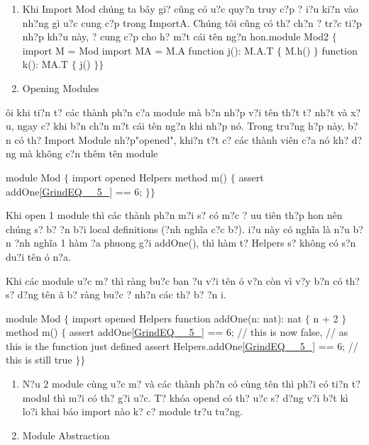 \documentclass{article} %
\begin{document}
\begin{enumerate}
\item  Khi Import Mod ch\'{u}ng ta b\^{a}y gi? c\~{u}ng c\'{o} {\dj}u?c quy?n truy c?p {\dj}? {\dj}i?u ki?n v\`{a}o nh?ng g\`{i} {\dj}u?c cung c?p trong ImportA. Ch\'{u}ng t\^{o}i c\~{u}ng c\'{o} th? ch?n {\dj}? tr?c ti?p nh?p kh?u n\`{a}y, {\dj}? cung c?p cho h? m?t c\'{a}i t\^{e}n ng?n hon.module Mod2 $\{$  import M = Mod  import MA = M.A  function j(): M.A.T $\{$ M.h() $\}$  function k(): MA.T $\{$ j() $\}$$\}$

\item  Opening Modules
\end{enumerate}

{\DJ}\^{o}i khi ti?n t? c\'{a}c th\`{a}nh ph?n c?a module m\`{a} b?n nh?p v?i t\^{e}n th?t t? nh?t v\`{a} x?u, ngay c? khi b?n ch?n m?t c\'{a}i t\^{e}n ng?n khi nh?p n\'{o}. Trong tru?ng h?p n\`{a}y, b?n c\'{o} th? Import Module nh?p"opened", khi?n t?t c? c\'{a}c th\`{a}nh vi\^{e}n c?a n\'{o} kh? d?ng m\`{a} kh\^{o}ng c?n th\^{e}m t\^{e}n module

module Mod $\{$  import opened Helpers  method m() $\{$    assert addOne\eqref{GrindEQ__5_} == 6;  $\}$$\}$

Khi open 1 module th\`{i} c\'{a}c th\`{a}nh ph?n m?i s? c\'{o} m?c {\dj}? uu ti\^{e}n th?p hon n\^{e}n ch\'{u}ng s? b? ?n b?i local definitions ({\dj}?nh ngh\~{i}a c?c b?). {\DJ}i?u n\`{a}y c\'{o} ngh\~{i}a l\`{a} n?u b?n {\dj}?nh ngh\~{i}a 1 h\`{a}m {\dj}?a phuong g?i addOne(), th\`{i} h\`{a}m t? Helpers s? kh\^{o}ng c\'{o} s?n du?i t\^{e}n {\dj}\'{o} n?a.

\noindent Khi c\'{a}c module {\dj}u?c m? th\`{i} r\`{a}ng bu?c ban {\dj}?u v?i t\^{e}n {\dj}\'{o} v?n c\`{o}n v\`{i} v?y b?n c\'{o} th? s? d?ng t\^{e}n {\dj}\~{a} b? r\`{a}ng bu?c {\dj}? nh?n c\'{a}c th? b? ?n {\dj}i.

\noindent module Mod $\{$  import opened Helpers  function addOne(n: nat): nat $\{$    n + 2  $\}$  method m() $\{$    assert addOne\eqref{GrindEQ__5_} == 6; // this is now false,                           // as this is the function just defined    assert Helpers.addOne\eqref{GrindEQ__5_} == 6; // this is still true  $\}$$\}$

\begin{enumerate}
\item  N?u 2 module c\`{u}ng {\dj}u?c m? v\`{a} c\'{a}c th\`{a}nh ph?n c\'{o} c\`{u}ng t\^{e}n th\`{i} ph?i c\'{o} ti?n t? modul th\`{i} m?i c\'{o} th? g?i {\dj}u?c. T? kh\'{o}a opend c\'{o} th? {\dj}u?c s? d?ng  v?i b?t k\`{i} lo?i khai b\'{a}o import n\`{a}o k? c? module tr?u tu?ng.

\item  Module Abstraction\underbar{}
\end{enumerate}
\end{document}
